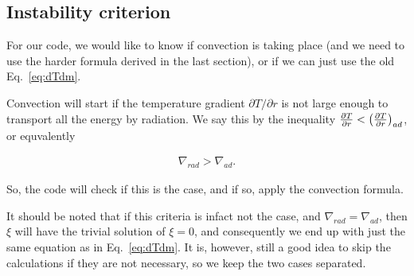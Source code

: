 \documentclass[11pt,twocolumn]{article}
\begin{document}
\subsection{Instability criterion}
\label{sub:Instability criterion}

For our code, we would like to know if convection is taking place (and we need to use the harder formula derived in the last section), or if we can just use the old Eq.~\eqref{eq:dTdm}.

Convection will start if the temperature gradient $\partial T/\partial r$ is not large enough to transport all the energy by radiation. We say this by the inequality $\frac{\partial T}{\partial r} < \left(\frac{\partial T}{\partial r}\right)_{ad}$, or equvalently

\begin{align}
    \nabla_{rad} > \nabla_{ad}\label{eq:instability-criterion}.
\end{align}


So, the code will check if this is the case, and if so, apply the convection formula.

It should be noted that if this criteria is infact not the case, and $\nabla_{rad} = \nabla_{ad}$, then $\xi$ will have the trivial solution of $\xi=0$, and consequently we end up with just the same equation as in Eq.~\eqref{eq:dTdm}. It is, however, still a good idea to skip the calculations if they are not necessary, so we keep the two cases separated.



\printbibliography
\end{document}
